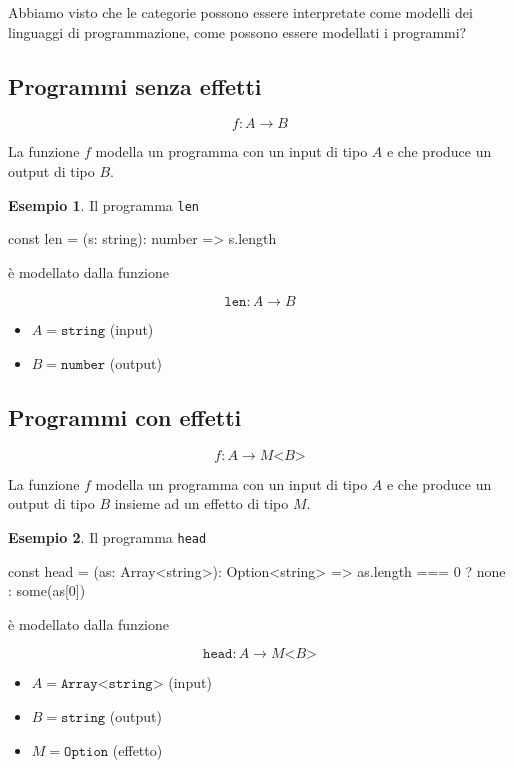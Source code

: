 \documentclass[12pt]{article}
\theoremstyle{definition}
\newtheorem{example}{Esempio}[section]
\newenvironment{code}
  {\vspace{0.5cm} \VerbatimEnvironment\begin{typescriptcode}}
  {\end{typescriptcode} \vspace{0.2cm}}
\begin{document}
Abbiamo visto che le categorie possono essere interpretate come modelli dei linguaggi di programmazione,
come possono essere modellati i programmi?

\subsection{Programmi senza effetti}

$$
f: A \rightarrow B
$$

La funzione $f$ modella un programma con un input di tipo $A$ e che produce un output di tipo $B$.

\begin{example}
Il programma \texttt{len}

\begin{code}
const len = (s: string): number => s.length
\end{code}

è modellato dalla funzione

$$
\texttt{len}: A \rightarrow B
$$

\begin{itemize}
  \item $A = \texttt{string}$ (input)
  \item $B = \texttt{number}$ (output)
\end{itemize}
\end{example}

\subsection{Programmi con effetti}

$$
f: A \rightarrow M \texttt{<} B \texttt{>}
$$

La funzione $f$ modella un programma con un input di tipo $A$ e che produce un output di tipo $B$ insieme ad un effetto di tipo $M$.

\begin{example}
Il programma \texttt{head}

\begin{code}
const head = (as: Array<string>): Option<string> =>
  as.length === 0 ? none : some(as[0])
\end{code}

è modellato dalla funzione

$$
\texttt{head}: A \rightarrow M \texttt{<} B \texttt{>}
$$

\begin{itemize}
  \item $A = \texttt{Array<string>}$ (input)
  \item $B = \texttt{string}$ (output)
  \item $M = \texttt{Option}$ (effetto)
\end{itemize}
\end{example}
\end{document}
